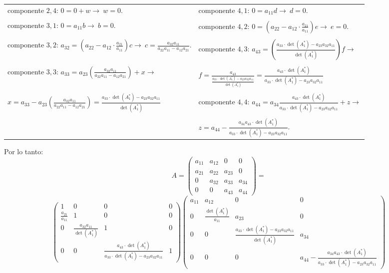 \documentclass[11pt,letterpaper]{article}
\begin{document}
\begin{enumerate}
\begin{table}[H]
\begin{tabular}{l|l}
componente $2,4$: $0=0+w \rightarrow \ w=0.$ & componente $4,1$: $0=a_{11}d \rightarrow \ d=0.$\\ \\
componente $3,1$: $0=a_{11}b \rightarrow \ b=0.$ & componente $4,2$: $0=\left(a_{22}-a_{12}\cdot \frac{a_{21}}{a_{11}}\right) e \rightarrow \ e=0.$\\ \\
componente $3,2$: $a_{32}=(a_{22}-a_{12}\cdot \left. \frac{a_{21}}{a_{11}}\right.)c \rightarrow \ c=\frac{a_{32}a_{11}}{a_{22}a_{11}-a_{12}a_{21}}.$ & componente $4,3$: $a_{43}=(\frac{a_{33}\cdot \det(A_1^*)-a_{23}a_{32}a_{11}}{\det(A_1^*)})f \rightarrow $\\ \\
componente $3,3$: $a_{33}=a_{23}\left(\frac{a_{32}a_{11}}{a_{22}a_{11}-a_{12}a_{21}}\right)+x \rightarrow$ & $f=\frac{a_{43}}{\frac{a_{33}\cdot \det(A_1^*)-a_{23}a_{32}a_{11}}{\det(A_1^*)}}=\frac{a_{43}\cdot \det(A_1^*)}{a_{33}\cdot \det(A_1^*)-a_{23}a_{32}a_{11}}$\\ \\ $x=a_{33}-a_{23}\left(\frac{a_{32}a_{11}}{a_{22}a_{11}-a_{12}a_{21}}\right)=\frac{a_{33}\cdot \det(A_1^*)-a_{23}a_{32}a_{11}}{\det(A_1^*)}$ & componente $4,4$: $a_{44}=a_{34}\frac{a_{43}\cdot \det(A_1^*)}{a_{33}\cdot \det(A_1^*)-a_{23}a_{32}a_{11}}+z \rightarrow $\\ \\
& $z=a_{44}-\frac{a_{34}a_{43}\cdot \det(A_1^*)}{a_{33}\cdot \det(A_1^*)-a_{23}a_{32}a_{11}}$.
\end{tabular}
\end{table}
Por lo tanto:
\begin{equation*}
A=\left(\begin{array}{cccc}
a_{11} & a_{12} &   0    &    0  \\
a_{21} & a_{22} & a_{23} &    0  \\
    0  & a_{32} & a_{33} & a_{34}\\
    0  &   0    & a_{43} & a_{44}
\end{array} \right)=
\end{equation*}
\begin{equation*}
\left(\begin{array}{cccc}
 1 &  0 &  0 & 0\\
 \frac{a_{21}}{a_{11}} &  1 &  0 & 0\\
 0 &  \frac{a_{32}a_{11}}{\det(A_1^*)} &  1 & 0\\
 0 &  0 &  \frac{a_{43}\cdot \det(A_1^*)}{a_{33}\cdot \det(A_1^*)-a_{23}a_{32}a_{11}} & 1
\end{array} \right) \left(\begin{array}{cccc}
 a_{11} &  a_{12} & 0 & 0\\
 0 & \frac{\det(A_1^*)}{a_{11}}&  a_{23} & 0\\
 0 &  0 &  \frac{a_{33}\cdot \det(A_1^*)-a_{23}a_{32}a_{11}}{\det(A_1^*)} & a_{34}\\
 0 &  0 &  0 & a_{44}-\frac{a_{34}a_{43}\cdot \det(A_1^*)}{a_{33}\cdot \det(A_1^*)-a_{23}a_{32}a_{11}}
\end{array} \right)
\end{equation*}


\end{enumerate}
\end{document}
